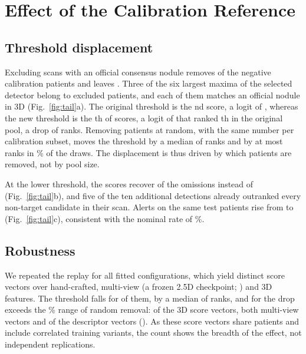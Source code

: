 \section{Effect of the Calibration Reference}
\label{sec:tail}

\subsection{Threshold displacement}

Excluding scans with an official consensus nodule removes \NExcluded{} of the \PCal{} negative calibration patients and leaves \UCal{}. Three of the six largest maxima of the selected detector belong to excluded patients, and each of them matches an official nodule in 3D (Fig.~\ref{fig:tail}a). The original threshold is the \PRank{}nd score, a logit of \PairCutoffP{}, whereas the new threshold is the \URank{}th of \UCal{} scores, a logit of \PairCutoffU{} that ranked \PairRank{}th in the original pool, a drop of \PairDrop{} ranks. Removing \NExcluded{} patients at random, with the same number per calibration subset, moves the threshold by a median of \PairRobustMedian{} ranks and by at most \PairControlHi{} ranks in \CILevel\% of the draws. The displacement is thus driven by which patients are removed, not by pool size.

At the lower threshold, the scores recover \PairHitsU{} of the \NOmitTest{} omissions instead of \PairHitsP{} (Fig.~\ref{fig:tail}b), and five of the ten additional detections already outranked every non-target candidate in their scan. Alerts on the same \UTest{} test patients rise from \PairAlertsP{} to \PairAlertsU{} (Fig.~\ref{fig:tail}c), consistent with the nominal rate of \AlphaPct\%.

\subsection{Robustness}

We repeated the replay for all \NHeadRows{} fitted configurations, which yield \NHeads{} distinct score vectors over hand-crafted, multi-view (a frozen 2.5D checkpoint; ) and 3D features. The threshold falls for \LowerHeads{} of them, by a median of \MedianDrop{} ranks, and for \PastBand{} the drop exceeds the \CILevel\% range of random removal: \PastBandLearned{} of the \NLearnedVectors{} 3D score vectors, both multi-view vectors and \PastBandDesc{} of the \NDescVectors{} descriptor vectors (). As these score vectors share patients and include correlated training variants, the count shows the breadth of the effect, not independent replications.

